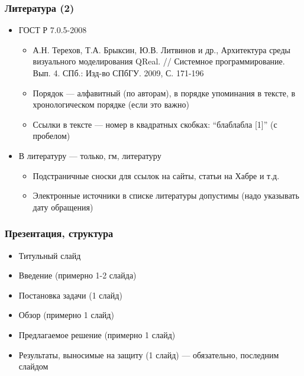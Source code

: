 \documentclass{../../slides-style}
\begin{document}
    \begin{frame}
        \frametitle{Литература (2)}
        \begin{itemize}
            \item ГОСТ Р 7.0.5-2008
            \begin{itemize}
                \item А.Н. Терехов, Т.А. Брыксин, Ю.В. Литвинов и др., Архитектура среды визуального моделирования QReal. // Системное программирование. Вып. 4. СПб.: Изд-во СПбГУ. 2009, С. 171-196
                \item Порядок --- алфавитный (по авторам), в порядке упоминания в тексте, в хронологическом порядке (если это важно)
                \item Ссылки в тексте --- номер в квадратных скобках: ``блаблабла [1]'' (с пробелом)
            \end{itemize}
            \item В литературу --- только, гм, литературу
            \begin{itemize}
                \item Подстраничные сноски для ссылок на сайты, статьи на Хабре и т.д.
                \item Электронные источники в списке литературы допустимы (надо указывать дату обращения)
            \end{itemize}
        \end{itemize}
    \end{frame}

    \begin{frame}
        \frametitle{Презентация, структура}
        \begin{itemize}
            \item Титульный слайд
            \item Введение (примерно 1-2 слайда)
            \item Постановка задачи (1 слайд)
            \item Обзор (примерно 1 слайд)
            \item Предлагаемое решение (примерно 1 слайд)
            \item Результаты, выносимые на защиту (1 слайд) --- обязательно, последним слайдом
        \end{itemize}
    \end{frame}
\end{document}
